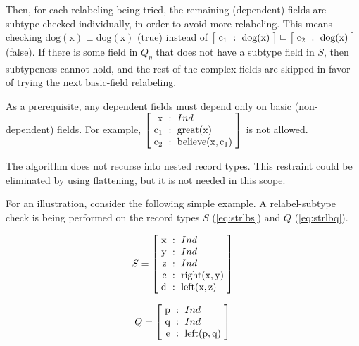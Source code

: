 Then, for each relabeling being tried, the remaining (dependent) fields are subtype-checked individually, in order to avoid more relabeling.
This means checking
$\text{dog}(\text{x}) \sqsubseteq \text{dog}(\text{x})$ (true) instead of
$\rec{\text{c}_1 &:& \text{dog}(\text{x})} \sqsubseteq \rec{\text{c}_2 &:& \text{dog}(\text{x})}$ (false).
If there is some field in $Q_\eta$ that does not have a subtype field in $S$, then subtypeness cannot hold, and the rest of the complex fields are skipped in favor of trying the next basic-field relabeling.


As a prerequisite, any dependent fields must depend only on basic (non-dependent) fields.
For example, $\rec{
\text{x} &:& Ind \\
\text{c}_1 &:& \text{great}(\text{x}) \\
\text{c}_2 &:& \text{believe}(\text{x}, \text{c}_1)
}$ is not allowed.

The algorithm does not recurse into nested record types.
This restraint could be eliminated by using flattening, but it is not needed in this scope.


For an illustration, consider the following simple example.
A relabel-subtype check is being performed on the record types $S$ (\autoref{eq:strlbs}) and $Q$ (\autoref{eq:strlbq}).

\begin{equation}\label{eq:strlbs}
S = \rec{
    \text{x} &:& Ind \\
    \text{y} &:& Ind \\
    \text{z} &:& Ind \\
    \text{c} &:& \text{right}(\text{x}, \text{y}) \\
    \text{d} &:& \text{left}(\text{x}, \text{z})
    }
\end{equation}

\begin{equation}\label{eq:strlbq}
Q = \rec{
    \text{p} &:& Ind \\
    \text{q} &:& Ind \\
    \text{e} &:& \text{left}(\text{p}, \text{q})
    }
\end{equation}


